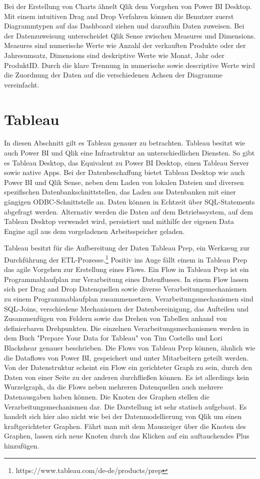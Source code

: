 Bei der Erstellung von Charts ähnelt Qlik dem Vorgehen von Power BI Desktop. Mit einem intuitiven
Drag and Drop Verfahren können die Benutzer zuerst Diagrammtypen auf das Dashboard ziehen und
daraufhin Daten zuweisen. Bei der Datenzuweisung unterscheidet Qlik Sense zwischen Measures und
Dimensions. Measures sind numerische Werte wie Anzahl der verkauften Produkte oder der Jahresumsatz,
Dimensions sind deskriptive Werte wie Monat, Jahr oder ProduktID.\cite{TutorialsSpotMeasuresDimensions}
Durch die klare Trennung in numerische sowie descriptive Werte wird die Zuordnung der Daten
auf die verschiedenen Achsen der Diagramme vereinfacht.

\section{Tableau}
\label{sec:tableau}
In diesen Abschnitt gilt es Tableau genauer zu betrachten. Tableau besitzt wie auch Power BI und Qlik
eine Infrastruktur an unterschiedlichen Diensten. So gibt es Tableau Desktop, das Equivalent zu Power BI
Desktop, einen Tableau Server sowie native Apps. Bei der Datenbeschaffung bietet Tableau Desktop wie auch
Power BI und Qlik Sense, neben dem Laden von lokalen Dateien und diversen spezifischen Datenbankschnittstellen,
das Laden aus Datenbanken mit einer gängigen ODBC-Schnittstelle an. Daten können in Echtzeit
über SQL-Statements abgefragt werden. Alternativ werden die Daten auf dem Betriebssystem, auf dem
Tableau Desktop verwendet wird, persistiert und mithilfe der eigenen Data Engine agil aus dem
vorgeladenen Arbeitsspeicher geladen.\cite[S. 50]{ProTableauBook}

Tableau besitzt für die Aufbereitung der Daten Tableau Prep, ein Werkzeug zur Durchführung der
ETL-Prozesse.\footnote{https://www.tableau.com/de-de/products/prep} Positiv ins Auge fällt einem
in Tableau Prep das agile Vorgehen zur Erstellung eines Flows. Ein Flow in Tableau Prep ist ein Programmablaufplan
zur Verarbeitung eines Datenflusses. In einem Flow lassen sich per Drag and Drop Datenquellen sowie diverse Verarbeitungsmechanismen zu einem Programmablaufplan
zusammensetzen. Verarbeitungsmechanismen sind SQL-Joins, verschiedene Mechanismen der Datenbereinigung,
das Aufteilen und Zusammenfügen von Feldern sowie das Drehen von Tabellen anhand von definierbaren Drehpunkten.
Die einzelnen Verarbeitungsmechanismen werden in dem Buch "Prepare Your Data for Tableau" von Tim Costello und
Lori Blackshear genauer beschrieben.\cite{PrepareYourDataForTableauBook} Die Flows von Tableau Prep können,
ähnlich wie die Dataflows von Power BI, gespeichert und unter Mitarbeitern geteilt werden. Von der Datenstruktur
scheint ein Flow ein gerichteter Graph zu sein, durch den Daten von einer Seite zu der anderen durchfließen
können. Es ist allerdings kein Wurzelgraph, da die Flows neben mehreren Datenquellen auch mehrere Datenausgaben
haben können. Die Knoten des Graphen stellen die Verarbeitungsmechanismen dar. Die Darstellung ist sehr statisch
aufgebaut. Es handelt sich hier also nicht wie bei der Datenmodellierung von Qlik um einen kraftgerichteter Graphen.
Fährt man mit dem Mauszeiger über die Knoten des Graphen, lassen sich neue Knoten durch das Klicken auf ein
auftauchendes Plus hinzufügen.

